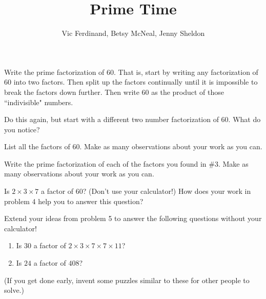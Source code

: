 \documentclass[noauthor, nooutcomes, handout]{ximera}
\title{Prime Time}
\author{Vic Ferdinand, Betsy McNeal, Jenny Sheldon}
\begin{document}
\begin{abstract} \end{abstract}
\maketitle



\begin{problem}
 Write the prime factorization of 60.  That is, start by writing any factorization of 60 into two factors.  Then split up the factors continually until it is impossible to break the factors down further.  Then write 60 as the product of those ``indivisible" numbers.
\end{problem} 
\begin{problem}
 Do this again, but start with a different two number factorization of 60.  What do you notice?
\end{problem} 
\begin{problem}
 List all the factors of 60.  Make as many observations about your work as you can.
\end{problem} 
\begin{problem}\label{PrimeTime4}
 Write the prime factorization of each of the factors you found in $\#$3.  Make as many observations about your work as you can.  %
\end{problem} 

\begin{problem}
Is $2 \times 3 \times 7$ a factor of $60$? (Don't use your calculator!) How does your work in problem 4 help you to answer this question?
\end{problem}


\begin{problem}
Extend your ideas from problem 5 to answer the following questions without your calculator!
\begin{enumerate}
    \item Is $30$ a factor of $2 \times 3 \times 7 \times 7 \times 11$?
    \item Is $24$ a factor of $408$?
\end{enumerate}

(If you get done early, invent some puzzles similar to these for other people to solve.)
\end{problem}
\end{document}
